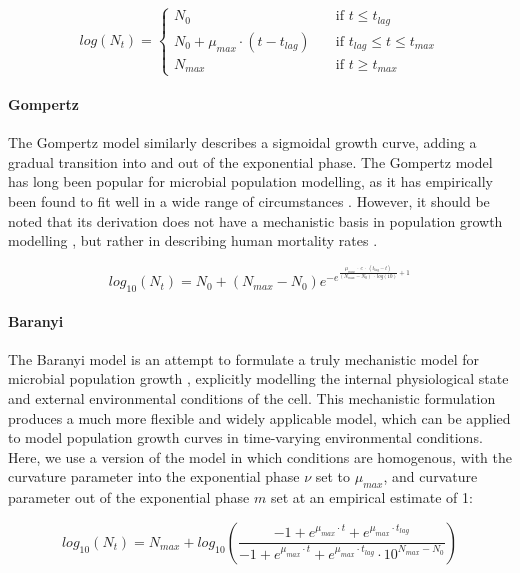 \documentclass[11pt, a4paper]{article}
\begin{document}
\begin{linenumbers}
  \[
    log(N_t) = \begin{cases}{}
        N_0 & \quad \text{if } t\leq t_{lag}\\
        N_0 + \mu_{max} \cdot (t - t_{lag}) &  \quad \text{if } t_{lag}\leq t\leq t_{max}\\
        N_{max} &  \quad \text{if } t\geq t_{max}
        \end{cases}
  \]

\paragraph{Gompertz}

The Gompertz model \cite{Gomp, zwitmodelling} similarly describes a sigmoidal growth curve, adding a gradual transition into and out of the exponential phase. The Gompertz model has long been popular for microbial population modelling, as it has empirically been found to fit well in a wide range of circumstances \cite{MicrobialGrowth}. However, it should be noted that its derivation does not have a mechanistic basis in population growth modelling \cite{EstBaranyi}, but rather in describing human mortality rates \cite{Gomp}. 

  \[log_{10}(N_t) = N_0 + (N_{max} - N_0)  e^{-e^{ \frac{\mu_{max} ~ \cdot ~ e  ~ \cdot ~ (t_{lag} - t)}{ (N_{max} - N_0) ~ \cdot ~ log(10)} + 1} }\]
  
  
\paragraph{Baranyi}

The Baranyi model is an attempt to formulate a truly mechanistic model for microbial population growth \cite{BaranyiOriginal, zwitmodelling}, explicitly modelling the internal physiological state and external environmental conditions of the cell. This mechanistic formulation produces a much more flexible and widely applicable model, which can be applied to model population growth curves in time-varying environmental conditions. Here,  we use a version of the model in which conditions are homogenous, with the curvature parameter into the exponential phase $\nu$ set to $\mu_{max}$, and curvature parameter out of the exponential phase $m$ set at an empirical estimate of 1:

\[ log_{10}(N_t) = N_{max} + log_{10}(\frac{-1 + e^{\mu_{max} \cdot  t} + e^{\mu_{max} \cdot t_{lag}  } }{ -1 + e^{\mu_{max} \cdot t}  + e^{\mu_{max} \cdot t_{lag}} \cdot 10^{N_{max}-N_0}}) \]



\end{linenumbers}
\end{document}
